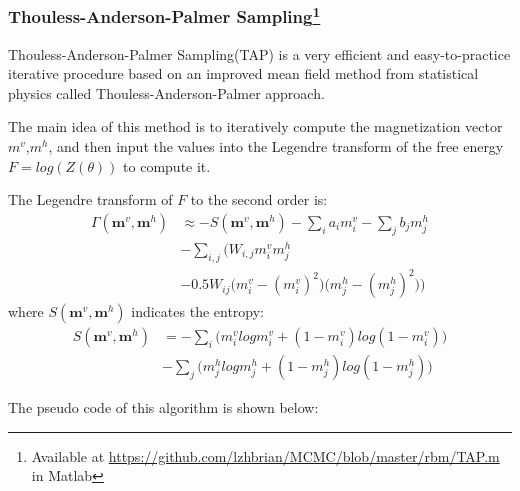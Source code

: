 
\subsubsection{Thouless-Anderson-Palmer Sampling\protect\footnote{Available at \protect\url{https://github.com/lzhbrian/MCMC/blob/master/rbm/TAP.m} in Matlab}}
Thouless-Anderson-Palmer Sampling(TAP)\cite{gabrie2015training} is a very efficient and easy-to-practice iterative procedure based on an improved mean field method from statistical physics called Thouless-Anderson-Palmer approach.

The main idea of this method is to iteratively compute the magnetization vector $m^{v}$,$m^{h}$, and then input the values into the Legendre transform of the free energy $F=log(Z(\theta))$ to compute it.

The Legendre transform of $F$ to the second order is:
\begin{equation}
\begin{split}
\Gamma(\mathbf m^{v},\mathbf m^{h}) &\approx - S(\mathbf m^{v},\mathbf m^{h}) - \sum_{i} a_{i}m^{v}_{i} - \sum_{j} b_{j}m^{h}_{j} \\
& - \sum_{i,j} \Bigg( W_{i,j}m^{v}_{i}m^{h}_{j} \\
& - 0.5W_{ij}\Big(m^{v}_{i}-(m^{v}_{i})^2\Big)\Big(m^{h}_{j}-(m^{h}_{j})^2\Big) \Bigg)
\end{split}
\end{equation}
where $S(\mathbf m^{v},\mathbf m^{h})$ indicates the entropy:
\begin{equation}
\begin{split}
S(\mathbf m^{v},\mathbf m^{h}) &= - \sum_{i} \Bigg(m^{v}_{i}logm^{v}_{i} + (1-m^{v}_{i})log(1-m^{v}_{i}) \Bigg) \\
&- \sum_{j} \Bigg(m^{h}_{j}logm^{h}_{j} + (1-m^{h}_{j})log(1-m^{h}_{j}) \Bigg)
\end{split}
\end{equation}

The pseudo code of this algorithm is shown below:

